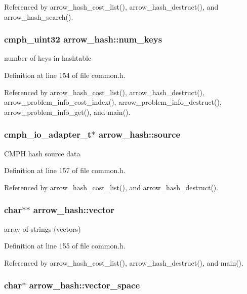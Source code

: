 Referenced by arrow\_\-hash\_\-cost\_\-list(), arrow\_\-hash\_\-destruct(), and arrow\_\-hash\_\-search().\hypertarget{structarrow__hash_f75ec1b9382f5b646007f8acb0521c15}{
\subsubsection[{num\_\-keys}]{\setlength{\rightskip}{0pt plus 5cm}cmph\_\-uint32 {\bf arrow\_\-hash::num\_\-keys}}}
\label{structarrow__hash_f75ec1b9382f5b646007f8acb0521c15}


number of keys in hashtable 

Definition at line 154 of file common.h.

Referenced by arrow\_\-hash\_\-cost\_\-list(), arrow\_\-hash\_\-destruct(), arrow\_\-problem\_\-info\_\-cost\_\-index(), arrow\_\-problem\_\-info\_\-destruct(), arrow\_\-problem\_\-info\_\-get(), and main().\hypertarget{structarrow__hash_202a3f5b2689ae35543ef2c7ea84a6c2}{
\subsubsection[{source}]{\setlength{\rightskip}{0pt plus 5cm}cmph\_\-io\_\-adapter\_\-t$\ast$ {\bf arrow\_\-hash::source}}}
\label{structarrow__hash_202a3f5b2689ae35543ef2c7ea84a6c2}


CMPH hash source data 

Definition at line 157 of file common.h.

Referenced by arrow\_\-hash\_\-cost\_\-list(), and arrow\_\-hash\_\-destruct().\hypertarget{structarrow__hash_91eeed74d32d354b4e8b03be8b51f058}{
\subsubsection[{vector}]{\setlength{\rightskip}{0pt plus 5cm}char$\ast$$\ast$ {\bf arrow\_\-hash::vector}}}
\label{structarrow__hash_91eeed74d32d354b4e8b03be8b51f058}


array of strings (vectors) 

Definition at line 155 of file common.h.

Referenced by arrow\_\-hash\_\-cost\_\-list(), arrow\_\-hash\_\-destruct(), and main().\hypertarget{structarrow__hash_298c5f151d99d62d6be200a620a4b4c3}{
\subsubsection[{vector\_\-space}]{\setlength{\rightskip}{0pt plus 5cm}char$\ast$ {\bf arrow\_\-hash::vector\_\-space}}}
\label{structarrow__hash_298c5f151d99d62d6be200a620a4b4c3}


